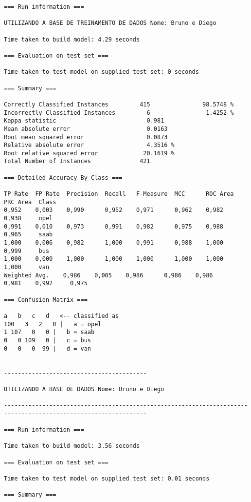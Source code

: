 \documentclass[
	article,			%
	11pt,				%
	oneside,			%
	a4paper,			%
	english,			%
	brazil,				%
	sumario=tradicional
	]{abntex2}
\begin{document}
\begin{lstlisting}
=== Run information ===

UTILIZANDO A BASE DE TREINAMENTO DE DADOS Nome: Bruno e Diego

Time taken to build model: 4.29 seconds

=== Evaluation on test set ===

Time taken to test model on supplied test set: 0 seconds

=== Summary ===

Correctly Classified Instances         415               98.5748 %
Incorrectly Classified Instances         6                1.4252 %
Kappa statistic                          0.981 
Mean absolute error                      0.0163
Root mean squared error                  0.0873
Relative absolute error                  4.3516 %
Root relative squared error             20.1619 %
Total Number of Instances              421     

=== Detailed Accuracy By Class ===

TP Rate  FP Rate  Precision  Recall   F-Measure  MCC      ROC Area  PRC Area  Class
0,952    0,003    0,990      0,952    0,971      0,962    0,982     0,938     opel
0,991    0,010    0,973      0,991    0,982      0,975    0,988     0,965     saab
1,000    0,006    0,982      1,000    0,991      0,988    1,000     0,999     bus
1,000    0,000    1,000      1,000    1,000      1,000    1,000     1,000     van
Weighted Avg.    0,986    0,005    0,986      0,986    0,986      0,981    0,992     0,975     

=== Confusion Matrix ===

a   b   c   d   <-- classified as
100   3   2   0 |   a = opel
1 107   0   0 |   b = saab
0   0 109   0 |   c = bus
0   0   0  99 |   d = van

---------------------------------------------------------------------------------------------------------------

UTILIZANDO A BASE DE DADOS Nome: Bruno e Diego

---------------------------------------------------------------------------------------------------------------

=== Run information ===

Time taken to build model: 3.56 seconds

=== Evaluation on test set ===

Time taken to test model on supplied test set: 0.01 seconds

=== Summary ===


\end{lstlisting}
\end{document}
